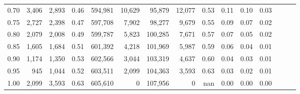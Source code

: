 \begin{tabular}{rrrrrrrrrrrrrrr}
0.70 &    3,406 &   2,893 &  0.46 &  594,981 &   10,629 &   95,879 &   12,077 &  0.53 &  0.11 &  0.10 &      0.03 \\
0.75 &    2,727 &   2,398 &  0.47 &  597,708 &    7,902 &   98,277 &    9,679 &  0.55 &  0.09 &  0.07 &      0.02 \\
0.80 &    2,079 &   2,008 &  0.49 &  599,787 &    5,823 &  100,285 &    7,671 &  0.57 &  0.07 &  0.05 &      0.02 \\
0.85 &    1,605 &   1,684 &  0.51 &  601,392 &    4,218 &  101,969 &    5,987 &  0.59 &  0.06 &  0.04 &      0.01 \\
0.90 &    1,174 &   1,350 &  0.53 &  602,566 &    3,044 &  103,319 &    4,637 &  0.60 &  0.04 &  0.03 &      0.01 \\
0.95 &      945 &   1,044 &  0.52 &  603,511 &    2,099 &  104,363 &    3,593 &  0.63 &  0.03 &  0.02 &      0.01 \\
1.00 &    2,099 &   3,593 &  0.63 &  605,610 &        0 &  107,956 &        0 &   nan &  0.00 &  0.00 &      0.00 \\
\bottomrule
\end{tabular}
